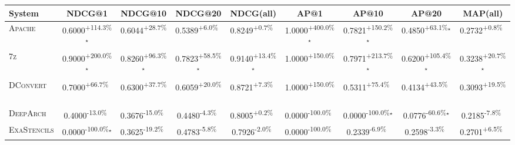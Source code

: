 \begin{table}[htbp]
\centering
\renewcommand{\arraystretch}{1.2}
\begin{tabular}{l|cccc|cccc}
\hline
System & NDCG@1 & NDCG@10 & NDCG@20 & NDCG(all) & AP@1 & AP@10 & AP@20 & MAP(all) \\ \hline
\textsc{Apache} & \cellcolor{green!30}0.6000\textsuperscript{+114.3\%}$^\star$ & \cellcolor{green!30}0.6044\textsuperscript{+28.7\%}$^{\,\,\,}$ & \cellcolor{green!30}0.5389\textsuperscript{+6.0\%}$^{\,\,\,}$ & \cellcolor{green!30}0.8249\textsuperscript{+0.7\%}$^{\,\,\,}$ & \cellcolor{green!30}1.0000\textsuperscript{+400.0\%}$^\star$ & \cellcolor{green!30}0.7821\textsuperscript{+150.2\%}$^\star$ & \cellcolor{green!30}0.4850\textsuperscript{+63.1\%}$^\star$ & \cellcolor{green!30}0.2732\textsuperscript{+0.8\%}$^{\,\,\,}$ \\
\textsc{7z} & \cellcolor{green!30}0.9000\textsuperscript{+200.0\%}$^\star$ & \cellcolor{green!30}0.8260\textsuperscript{+96.3\%}$^\star$ & \cellcolor{green!30}0.7823\textsuperscript{+58.5\%}$^\star$ & \cellcolor{green!30}0.9140\textsuperscript{+13.4\%}$^\star$ & \cellcolor{green!30}1.0000\textsuperscript{+150.0\%}$^{\,\,\,}$ & \cellcolor{green!30}0.7971\textsuperscript{+213.7\%}$^\star$ & \cellcolor{green!30}0.6200\textsuperscript{+105.4\%}$^\star$ & \cellcolor{green!30}0.3238\textsuperscript{+20.7\%}$^\star$ \\
\textsc{DConvert} & \cellcolor{green!30}0.7000\textsuperscript{+66.7\%}$^{\,\,\,}$ & \cellcolor{green!30}0.6300\textsuperscript{+37.7\%}$^{\,\,\,}$ & \cellcolor{green!30}0.6059\textsuperscript{+20.0\%}$^{\,\,\,}$ & \cellcolor{green!30}0.8721\textsuperscript{+7.3\%}$^{\,\,\,}$ & \cellcolor{green!30}1.0000\textsuperscript{+150.0\%}$^{\,\,\,}$ & \cellcolor{green!30}0.5311\textsuperscript{+75.4\%}$^{\,\,\,}$ & \cellcolor{green!30}0.4134\textsuperscript{+43.5\%}$^{\,\,\,}$ & \cellcolor{green!30}0.3093\textsuperscript{+19.5\%}$^{\,\,\,}$ \\
\textsc{DeepArch} & \cellcolor{red!30}0.4000\textsuperscript{-13.0\%}$^{\,\,\,}$ & \cellcolor{red!30}0.3676\textsuperscript{-15.0\%}$^{\,\,\,}$ & \cellcolor{red!30}0.4480\textsuperscript{-4.3\%}$^{\,\,\,}$ & \cellcolor{green!30}0.8005\textsuperscript{+0.2\%}$^{\,\,\,}$ & \cellcolor{red!30}0.0000\textsuperscript{-100.0\%}$^{\,\,\,}$ & \cellcolor{red!30}0.0000\textsuperscript{-100.0\%}$^\star$ & \cellcolor{red!30}0.0776\textsuperscript{-60.6\%}$^\star$ & \cellcolor{red!30}0.2185\textsuperscript{-7.8\%}$^{\,\,\,}$ \\
\textsc{ExaStencils} & \cellcolor{red!30}0.0000\textsuperscript{-100.0\%}$^\star$ & \cellcolor{red!30}0.3625\textsuperscript{-19.2\%}$^{\,\,\,}$ & \cellcolor{red!30}0.4783\textsuperscript{-5.8\%}$^{\,\,\,}$ & \cellcolor{red!30}0.7926\textsuperscript{-2.0\%}$^{\,\,\,}$ & \cellcolor{red!30}0.0000\textsuperscript{-100.0\%}$^{\,\,\,}$ & \cellcolor{red!30}0.2339\textsuperscript{-6.9\%}$^{\,\,\,}$ & \cellcolor{red!30}0.2598\textsuperscript{-3.3\%}$^{\,\,\,}$ & \cellcolor{green!30}0.2701\textsuperscript{+6.5\%}$^{\,\,\,}$ \\

\end{tabular}
\end{table}
